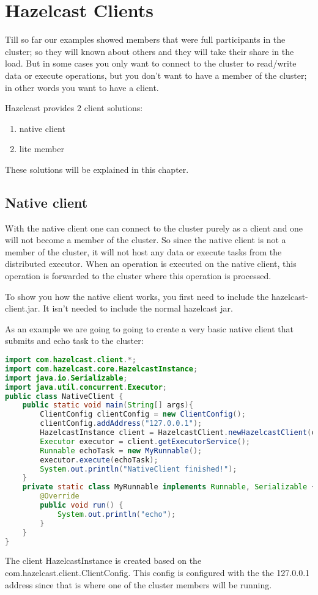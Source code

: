 \chapter{Hazelcast Clients}

Till so far our examples showed members that were full participants in the cluster; so they will known about others and they will take their share in the load. But in some cases you only want to connect to the cluster to read/write data or execute operations, but you don't want to have a member of the cluster; in other words you want to have a client.

Hazelcast provides 2 client solutions:
\begin{enumerate}
\item native client
\item lite member
\end{enumerate}
These solutions will be explained in this chapter.

\section{Native client}
With the native client one can connect to the cluster purely as a client and one will not become a member of the cluster. So since the native client is not a member of the cluster, it will not host any data or execute tasks from the distributed executor. When an operation is executed on the native client, this operation is forwarded to the cluster where this operation is processed.

To show you how the native client works, you first need to include the hazelcast-client.jar. It isn't needed to include the normal hazelcast jar.

As an example we are going to going to create a very basic native client that submits and echo task to the cluster:
\begin{lstlisting}[language=java]
import com.hazelcast.client.*;
import com.hazelcast.core.HazelcastInstance;
import java.io.Serializable;
import java.util.concurrent.Executor;
public class NativeClient {
    public static void main(String[] args){
        ClientConfig clientConfig = new ClientConfig();
        clientConfig.addAddress("127.0.0.1");
        HazelcastInstance client = HazelcastClient.newHazelcastClient(clientConfig);
        Executor executor = client.getExecutorService();
        Runnable echoTask = new MyRunnable();
        executor.execute(echoTask);
        System.out.println("NativeClient finished!");
    }
    private static class MyRunnable implements Runnable, Serializable {
        @Override
        public void run() {
            System.out.println("echo");
        }
    }
}
\end{lstlisting}
The client HazelcastInstance is created based on the com.hazelcast.client.ClientConfig. This config is configured with the the 127.0.0.1 address since that is where one of the cluster members will be running.

